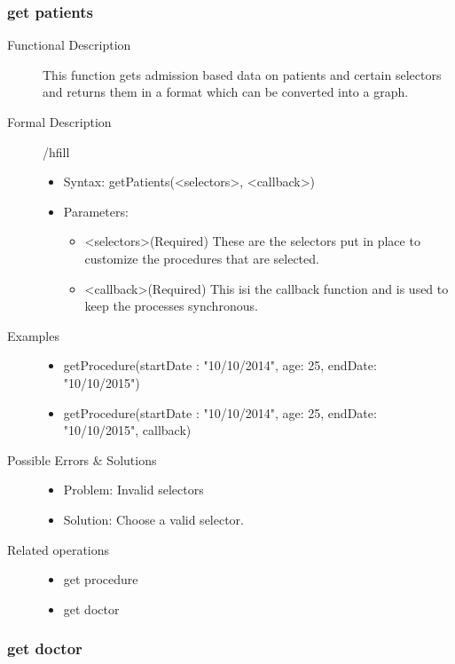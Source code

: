 \documentclass[a4paper]{article}
\begin{document}
\subsubsection{get patients}
\begin{description}
\item[Functional Description] This function gets admission based data on patients and certain selectors and returns them in a format which can be converted into a graph.
\item[Formal Description]/hfill
\begin{itemize}
	\item Syntax: getPatients(<selectors>, <callback>)\\
	\item Parameters:
		\begin{itemize}
			\item <selectors>(Required) These are the selectors put in place to customize the procedures that are selected.
			\item <callback>(Required) This isi the callback function and is used to keep the processes synchronous.
		\end{itemize}
\end{itemize}
\item[Examples]\hfill
\begin{itemize}
	\item getProcedure({startDate : "10/10/2014", age: 25, endDate: "10/10/2015"})
	\item getProcedure({startDate : "10/10/2014", age: 25, endDate: "10/10/2015"}, callback)
\end{itemize}
\item[Possible Errors \& Solutions]
\begin{itemize}
	\item Problem: Invalid selectors
	\item Solution: Choose a valid selector.
\end{itemize}
\item[Related operations] \hfill
\begin{itemize}
	\item get procedure
	\item get doctor
\end{itemize}
\end{description}

\subsubsection{get doctor}
\end{document}
